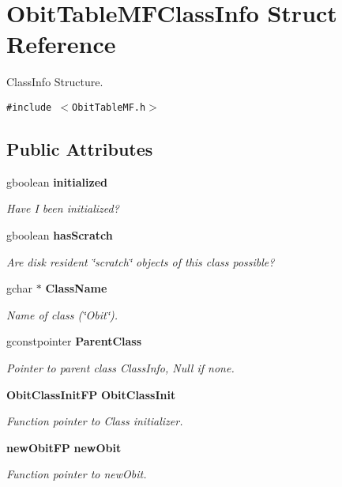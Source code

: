 \section{Obit\-Table\-MFClass\-Info Struct Reference}
\label{structObitTableMFClassInfo}
Class\-Info Structure.  


{\tt \#include $<$Obit\-Table\-MF.h$>$}

\subsection*{Public Attributes}
\begin{CompactItemize}
\item 
gboolean {\bf initialized}
\begin{CompactList}\small\item\em Have I been initialized? \item\end{CompactList}\item 
gboolean {\bf has\-Scratch}
\begin{CompactList}\small\item\em Are disk resident \char`\"{}scratch\char`\"{} objects of this class possible? \item\end{CompactList}\item 
gchar $\ast$ {\bf Class\-Name}
\begin{CompactList}\small\item\em Name of class (\char`\"{}Obit\char`\"{}). \item\end{CompactList}\item 
gconstpointer {\bf Parent\-Class}
\begin{CompactList}\small\item\em Pointer to parent class Class\-Info, Null if none. \item\end{CompactList}\item 
{\bf Obit\-Class\-Init\-FP} {\bf Obit\-Class\-Init}
\begin{CompactList}\small\item\em Function pointer to Class initializer. \item\end{CompactList}\item 
{\bf new\-Obit\-FP} {\bf new\-Obit}
\begin{CompactList}\small\item\em Function pointer to new\-Obit. \item\end{CompactList}\item 

\end{CompactItemize}
